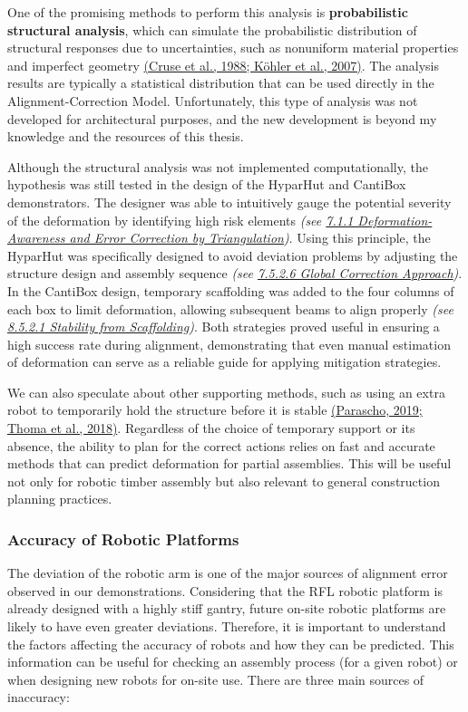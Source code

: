 \documentclass[11pt]{book}
\begin{document}
One of the promising methods to perform this analysis is \textbf{probabilistic structural analysis}, which can simulate the probabilistic distribution of structural responses due to uncertainties, such as nonuniform material properties and imperfect geometry \href{https://www.zotero.org/google-docs/?K9ZAGs}{(Cruse et al., 1988; Köhler et al., 2007)}. The analysis results are typically a statistical distribution that can be used directly in the Alignment-Correction Model. Unfortunately, this type of analysis was not developed for architectural purposes, and the new development is beyond my knowledge and the resources of this thesis. 

Although the structural analysis was not implemented computationally, the hypothesis was still tested in the design of the HyparHut and CantiBox demonstrators. The designer was able to intuitively gauge the potential severity of the deformation by identifying high risk elements \textit{(see \uline{7.1.1 Deformation-Awareness and Error Correction by Triangulation})}. Using this principle, the HyparHut was specifically designed to avoid deviation problems by adjusting the structure design and assembly sequence \textit{(see \uline{7.5.2.6 Global Correction Approach})}. In the CantiBox design, temporary scaffolding was added to the four columns of each box to limit deformation, allowing subsequent beams to align properly\textit{ (see \uline{8.5.2.1 Stability from Scaffolding})}. Both strategies proved useful in ensuring a high success rate during alignment, demonstrating that even manual estimation of deformation can serve as a reliable guide for applying mitigation strategies. 

We can also speculate about other supporting methods, such as using an extra robot to temporarily hold the structure before it is stable \href{https://www.zotero.org/google-docs/?lEdBdZ}{(Parascho, 2019; Thoma et al., 2018)}. Regardless of the choice of temporary support or its absence, the ability to plan for the correct actions relies on fast and accurate methods that can predict deformation for partial assemblies. This will be useful not only for robotic timber assembly but also relevant to general construction planning practices.

\subsubsection{Accuracy of Robotic Platforms}

The deviation of the robotic arm is one of the major sources of alignment error observed in our demonstrations. Considering that the RFL robotic platform is already designed with a highly stiff gantry, future on-site robotic platforms are likely to have even greater deviations. Therefore, it is important to understand the factors affecting the accuracy of robots and how they can be predicted. This information can be useful for checking an assembly process (for a given robot) or when designing new robots for on-site use. There are three main sources of inaccuracy:
\end{document}
